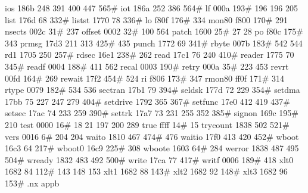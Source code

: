 ios             186b    248     391     400     447     565#
iot             186a    252     386     564#
lf              000a    193#    196     196     205
list            176d     68     332#
listst          1770     78     336#
lo              f80f    176#    334
mon80           f800    170#    291
nsects          002c     31#    237
offset          0002     32#    100     564
patch           1600     25#     27      28
po              f80c    175#    343
prmsg           17d3    211     313     425#    435
punch           1772     69     341#
rbyte           007b    183#    542     544
rd1             1705    250     257#
rdsec           16e1    238#    262
read            17c1     76     240     410#
reader          1775     70     345#
readf           0004    188#    411     562
recal           0003    190#
retry           000a     35#    223     453
revrt           00fd    164#    269
rewait          17f2    454#    524
ri              f806    173#    347
rmon80          ff0f    171#    314
rtype           0079    182#    534     536
sectran         17b1     79     394#
seldsk          177d     72     229     354#
setdma          17bb     75     227     247     279     404#
setdrive        1792    365     367#
setfunc         17e0    412     419     437#
setsec          17ac     74     233     259     390#
settrk          17a7     73     231     255     352     385#
signon          169c    195#    210
test            0000     16#     18      21     197     200     289
true            ffff     14#     15
trycount        1838    502     521#
vers            0016      6#    204     204
waito           1810    467     474#    476
waitio          17f0    413     420     452#
wboot           16c3     64     217#
wboot0          16c9    225#    308
wboote          1603     64#    284
werror          1838    487     495     504#
wready          1832    483     492     500#
write           17ca     77     417#
writf           0006    189#    418
xlt0            1682     84     112#    143     148     153
xlt1            1682     88     143#
xlt2            1682     92     148#
xlt3            1682     96     153#
.nx appb

